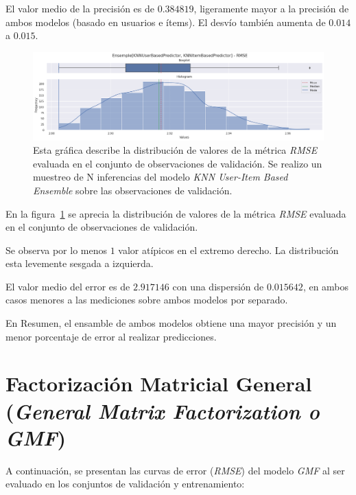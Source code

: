 \documentclass[11pt,a4paper,twoside]{thesis}
\begin{document}
El valor medio de la precisión es de $0.384819$, ligeramente mayor a la
precisión de ambos modelos (basado en usuarios e ítems). El desvío también
aumenta de $0.014$ a $0.015$.

\begin{figure}[!htb]
	\centering
	\includegraphics[width=15cm]{./images/metrics-knn-ensemple-RMSE.png}
	\caption{
		Esta gráfica describe la distribución de valores de la métrica
		\textit{RMSE} evaluada en el conjunto de observaciones de
		validación. Se realizo un muestreo de N inferencias del modelo
		\textit{KNN User-Item Based Ensemble} sobre las observaciones
		de validación.
	}
	\label{fig:knnEnsempleRMSE}
\end{figure}

En la figura~\ref{fig:knnEnsempleRMSE} se aprecia la distribución de valores de
la métrica \textit{RMSE} evaluada en el conjunto de observaciones de
validación.

Se observa por lo menos $1$ valor atípicos en el extremo derecho. La
distribución esta levemente sesgada a izquierda.

El valor medio del error es de $2.917146$ con una dispersión de $0.015642$, en
ambos casos menores a las mediciones sobre ambos modelos por separado.

En Resumen, el ensamble de ambos modelos obtiene una mayor precisión y un menor
porcentaje de error al realizar predicciones.

\clearpage
\section{Factorización Matricial General (\textit{General Matrix Factorization o GMF})}

A continuación, se presentan las curvas de error (\textit{RMSE}) del modelo
\textit{GMF} al ser evaluado en los conjuntos de validación y entrenamiento:
\end{document}
